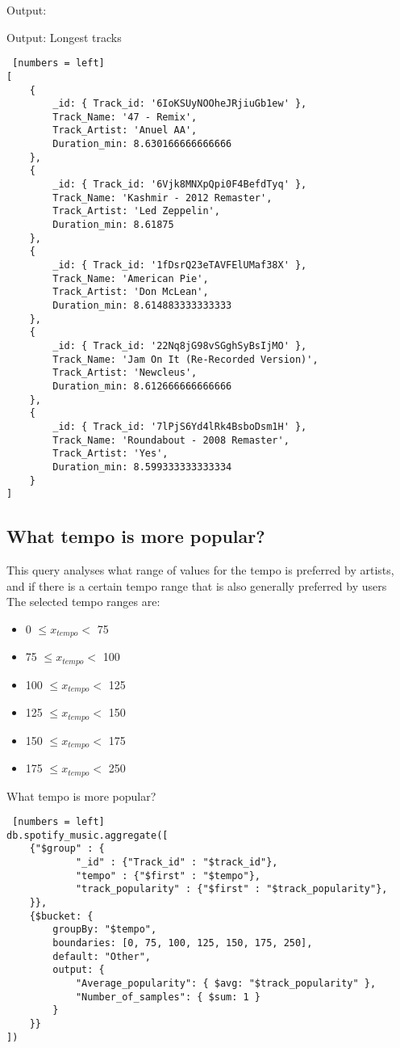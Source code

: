 Output:
\begin{algorithm}[h!]
\caption{Output: Longest tracks}
\begin{lstlisting} [numbers = left]
[
	{
		_id: { Track_id: '6IoKSUyNOOheJRjiuGb1ew' },
		Track_Name: '47 - Remix',
		Track_Artist: 'Anuel AA',
		Duration_min: 8.630166666666666
	},
	{
		_id: { Track_id: '6Vjk8MNXpQpi0F4BefdTyq' },
		Track_Name: 'Kashmir - 2012 Remaster',
		Track_Artist: 'Led Zeppelin',
		Duration_min: 8.61875
	},
	{
		_id: { Track_id: '1fDsrQ23eTAVFElUMaf38X' },
		Track_Name: 'American Pie',
		Track_Artist: 'Don McLean',
		Duration_min: 8.614883333333333
	},
	{
		_id: { Track_id: '22Nq8jG98vSGghSyBsIjMO' },
		Track_Name: 'Jam On It (Re-Recorded Version)',
		Track_Artist: 'Newcleus',
		Duration_min: 8.612666666666666
	},
	{
		_id: { Track_id: '7lPjS6Yd4lRk4BsboDsm1H' },
		Track_Name: 'Roundabout - 2008 Remaster',
		Track_Artist: 'Yes',
		Duration_min: 8.599333333333334
	}
]
\end{lstlisting}
\end{algorithm}
\newpage

\subsection{What tempo is more popular?}
This query analyses what range of values for the tempo is preferred by artists, and if there is a certain tempo range that is also generally preferred by users\\
The selected tempo ranges are:
\begin{itemize}
	\item 0 $\le x_{tempo} <$ 75
	\item 75 $\le x_{tempo} <$ 100
	\item 100 $\le x_{tempo} <$ 125
	\item 125 $\le x_{tempo} <$ 150
	\item 150 $\le x_{tempo} <$ 175
	\item 175 $\le x_{tempo} <$ 250
\end{itemize}

\begin{algorithm}[ht]
\caption{What tempo is more popular?}
\begin{lstlisting} [numbers = left]
db.spotify_music.aggregate([
	{"$group" : {
			"_id" : {"Track_id" : "$track_id"},
			"tempo" : {"$first" : "$tempo"},
			"track_popularity" : {"$first" : "$track_popularity"},
	}},
	{$bucket: {
		groupBy: "$tempo",
		boundaries: [0, 75, 100, 125, 150, 175, 250],
		default: "Other",
		output: {
			"Average_popularity": { $avg: "$track_popularity" },
			"Number_of_samples": { $sum: 1 }
		}
	}}
])
\end{lstlisting}
\end{algorithm}
\newpage

